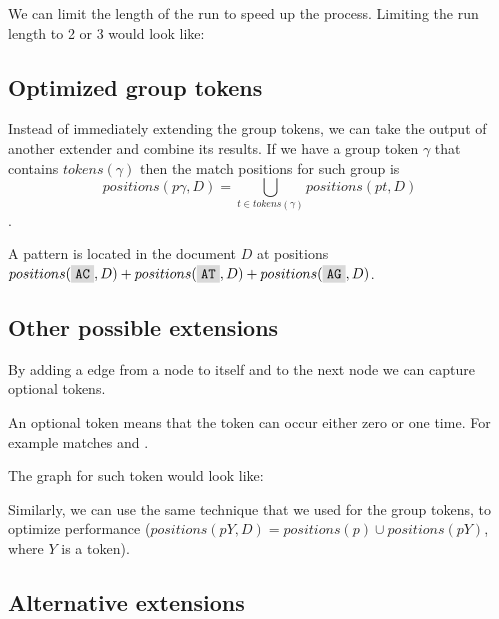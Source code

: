 \begin{figure}[H]
	
\end{figure}

We can limit the length of the run to speed up the process. Limiting the run length to 2 or 3 would look like:

\begin{figure}[H]
	
\end{figure}

\subsection{Optimized group tokens}

Instead of immediately extending the group tokens, we can take the output of another extender and combine its results. If we have a group token $\gamma$ that contains $tokens(\gamma)$ then the match positions for such group is $$positions(p\gamma, D) = \bigcup_{t \in tokens(\gamma)} positions(pt, D) $$.

\begin{exmp}
A pattern  is located in the document $D$ at positions $positions(\R{AC}, D) + positions(\R{AT}, D) + positions(\R{AG}, D)$.
\end{exmp}

\subsection{Other possible extensions}

By adding a edge from a node to itself and to the next node we can capture optional tokens.

\begin{exmp}
An optional token  means that the token  can occur either zero or one time. For example  matches  and .
\end{exmp}

The graph for such token would look like:

\begin{figure}[H]
	
\end{figure}

 Similarly, we can use the same technique that we used for the group tokens, to optimize performance ($positions(pY, D) = positions(p) \cup positions(pY)$, where $Y$ is a token).

\subsection{Alternative extensions}

